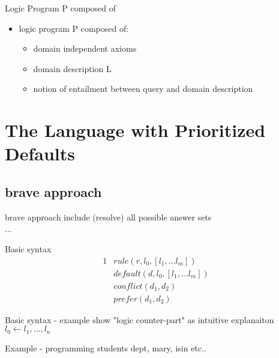 \documentclass{beamer}
\begin{document}
\begin{frame}{Logic Program P composed of}
\begin{itemize}
  \item logic program P composed of:
    \begin{itemize}
      \item domain independent axioms 
      \item domain description L
      \item notion of entailment between query and domain description
    \end{itemize}
\end{itemize}
\end{frame}

\section{The Language with Prioritized Defaults}

\subsection{brave approach}

\begin{frame}{brave approach}
  include (resolve) all possible answer sets\\
  ...
\end{frame}

\begin{frame}{Basic syntax}
  \begin{alignat}{1}
   & \label{item:rule1} rule(r, l_0, [l_1, \dots l_m]) \\
   & \label{item:rule2} default(d, l_0, [l_1, \dots l_m]) \\
   & \label{item:rule3} conflict(d_1, d_2) \\
   & \label{item:rule4} prefer(d_1, d_2)
  \end{alignat}
\end{frame}

\begin{frame}{Basic syntax - example}
  show "logic counter-part" as intuitive explanaiton\\
  $ l_0 \leftarrow l_1, \dots, l_n$
\end{frame}


\begin{frame}{Example - programming students}
  dept, mary, isin etc..
\end{frame}
\end{document}
